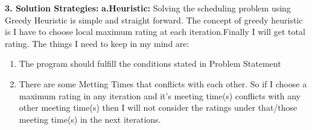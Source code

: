 \documentclass[paper=letter, fontsize=11pt]{scrartcl} %
\begin{document}
\Large \textbf{3. Solution Strategies:}
\normalsize \textbf{a.Heuristic:}
Solving the scheduling problem using Greedy Heuristic is simple and straight forward. The concept of greedy heuristic is 
I have to choose local maximum rating at each iteration.Finally I will get total rating. The things I need to keep in 
my mind are:  
\begin{enumerate}
\item The program should fulfill the conditions stated in Problem Statement
\item There are some Metting Times that conflicts with each other. So if I choose a maximum rating in any iteration and
it's meeting time(s) conflicts with any other meeting time(s) then I will not consider the ratings under that/those 
meeting time(s) in the next iterations.
\end{enumerate}  




\end{document}
